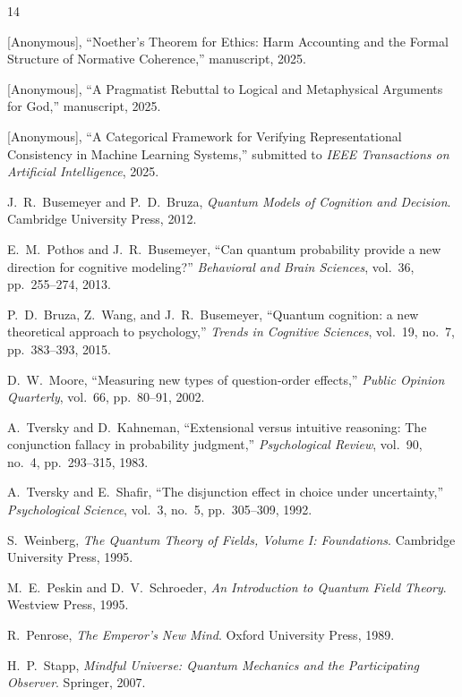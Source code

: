\documentclass[12pt]{article}
\begin{document}
\begin{thebibliography}{14}

[Anonymous], ``Noether's Theorem for Ethics: Harm Accounting and the Formal Structure of Normative Coherence,'' manuscript, 2025.

[Anonymous], ``A Pragmatist Rebuttal to Logical and Metaphysical Arguments for God,'' manuscript, 2025.

[Anonymous], ``A Categorical Framework for Verifying Representational Consistency in Machine Learning Systems,'' submitted to \emph{IEEE Transactions on Artificial Intelligence}, 2025.

J.~R.~Busemeyer and P.~D.~Bruza, \emph{Quantum Models of Cognition and Decision}. Cambridge University Press, 2012.

E.~M.~Pothos and J.~R.~Busemeyer, ``Can quantum probability provide a new direction for cognitive modeling?'' \emph{Behavioral and Brain Sciences}, vol.~36, pp.~255--274, 2013.

P.~D.~Bruza, Z.~Wang, and J.~R.~Busemeyer, ``Quantum cognition: a new theoretical approach to psychology,'' \emph{Trends in Cognitive Sciences}, vol.~19, no.~7, pp.~383--393, 2015.

D.~W.~Moore, ``Measuring new types of question-order effects,'' \emph{Public Opinion Quarterly}, vol.~66, pp.~80--91, 2002.

A.~Tversky and D.~Kahneman, ``Extensional versus intuitive reasoning: The conjunction fallacy in probability judgment,'' \emph{Psychological Review}, vol.~90, no.~4, pp.~293--315, 1983.

A.~Tversky and E.~Shafir, ``The disjunction effect in choice under uncertainty,'' \emph{Psychological Science}, vol.~3, no.~5, pp.~305--309, 1992.

S.~Weinberg, \emph{The Quantum Theory of Fields, Volume I: Foundations}. Cambridge University Press, 1995.

M.~E.~Peskin and D.~V.~Schroeder, \emph{An Introduction to Quantum Field Theory}. Westview Press, 1995.

R.~Penrose, \emph{The Emperor's New Mind}. Oxford University Press, 1989.

H.~P.~Stapp, \emph{Mindful Universe: Quantum Mechanics and the Participating Observer}. Springer, 2007.


\end{thebibliography}
\end{document}
